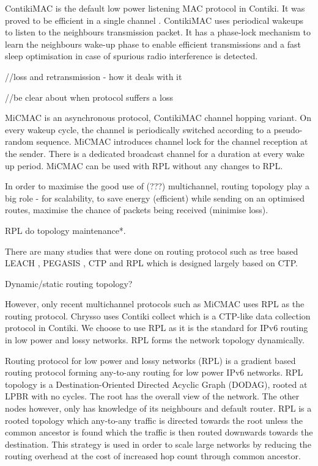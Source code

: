 ContikiMAC \cite{contikimac} is the default low power listening MAC protocol in Contiki. It was proved to be efficient in a single channel \cite{micmac}\cite{orpl}. ContikiMAC uses periodical wakeups to listen to the neighbours transmission packet. It has a phase-lock mechanism to learn the neighbours wake-up phase to enable efficient transmissions and a fast sleep optimisation in case of spurious radio interference is detected.

//loss and retransmission - how it deals with it

//be clear about when protocol suffers a loss

MiCMAC \cite{micmac} is an asynchronous protocol, ContikiMAC \cite{contikimac} channel hopping variant. On every wakeup cycle, the channel is periodically switched according to a pseudo-random sequence. MiCMAC introduces channel lock for the channel reception at the sender. There is a dedicated broadcast channel for a duration at every wake up period. MiCMAC can be used with RPL without any changes to RPL. %

In order to maximise the good use of (???) multichannel, routing topology play a big role - for scalability, to save energy (efficient) while sending on an optimised routes, maximise the chance of packets being received (minimise loss).

RPL do topology maintenance*.

There are many studies that were done on routing protocol such as tree based LEACH \cite{leach}, PEGASIS \cite{pegasis}, CTP \cite{ctp} and RPL which is designed largely based on CTP.

Dynamic/static routing topology?


However, only recent multichannel protocols such as MiCMAC uses RPL as the routing protocol. Chrysso uses Contiki collect which is a CTP-like data collection protocol in Contiki. We choose to use RPL as it is the standard for IPv6 routing in low power and lossy networks. RPL forms the network topology dynamically.

Routing protocol for low power and lossy networks (RPL) is a gradient based routing protocol forming any-to-any routing for low power IPv6 networks. RPL topology is a Destination-Oriented Directed Acyclic Graph (DODAG), rooted at LPBR with no cycles. The root has the overall view of the network. The other nodes however, only has knowledge of its neighbours and default router. RPL is a rooted topology which any-to-any traffic is directed towards the root unless the common ancestor is found which the traffic is then routed downwards towards the destination. This strategy is used in order to scale large networks by reducing the routing overhead at the cost of increased hop count through common ancestor. 

